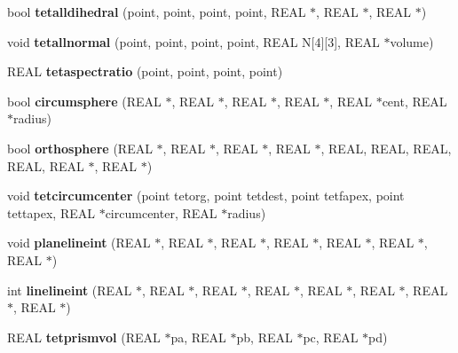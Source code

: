\begin{DoxyCompactItemize}
bool {\bfseries tetalldihedral} (point, point, point, point, R\+E\+AL $\ast$, R\+E\+AL $\ast$, R\+E\+AL $\ast$)
\item 
\mbox{\label{classtetgenmesh_a1d88027411fb3b8f7c3752b1a0b3eb14}} 
void {\bfseries tetallnormal} (point, point, point, point, R\+E\+AL N\mbox{[}4\mbox{]}\mbox{[}3\mbox{]}, R\+E\+AL $\ast$volume)
\item 
\mbox{\label{classtetgenmesh_a891ca3fde48f9e3378e14d5537216853}} 
R\+E\+AL {\bfseries tetaspectratio} (point, point, point, point)
\item 
\mbox{\label{classtetgenmesh_aa7ba47e0a0433aa33adc5310c9cf1b84}} 
bool {\bfseries circumsphere} (R\+E\+AL $\ast$, R\+E\+AL $\ast$, R\+E\+AL $\ast$, R\+E\+AL $\ast$, R\+E\+AL $\ast$cent, R\+E\+AL $\ast$radius)
\item 
\mbox{\label{classtetgenmesh_ab7a2c051ce249ec2921fffd2c6c0f24b}} 
bool {\bfseries orthosphere} (R\+E\+AL $\ast$, R\+E\+AL $\ast$, R\+E\+AL $\ast$, R\+E\+AL $\ast$, R\+E\+AL, R\+E\+AL, R\+E\+AL, R\+E\+AL, R\+E\+AL $\ast$, R\+E\+AL $\ast$)
\item 
\mbox{\label{classtetgenmesh_a215ee31d43785644ae7049d318e2b773}} 
void {\bfseries tetcircumcenter} (point tetorg, point tetdest, point tetfapex, point tettapex, R\+E\+AL $\ast$circumcenter, R\+E\+AL $\ast$radius)
\item 
\mbox{\label{classtetgenmesh_a883cf2b9f86e671d486bc33b37b4efe6}} 
void {\bfseries planelineint} (R\+E\+AL $\ast$, R\+E\+AL $\ast$, R\+E\+AL $\ast$, R\+E\+AL $\ast$, R\+E\+AL $\ast$, R\+E\+AL $\ast$, R\+E\+AL $\ast$)
\item 
\mbox{\label{classtetgenmesh_add5ae26e506dad8a94508127140b6aa4}} 
int {\bfseries linelineint} (R\+E\+AL $\ast$, R\+E\+AL $\ast$, R\+E\+AL $\ast$, R\+E\+AL $\ast$, R\+E\+AL $\ast$, R\+E\+AL $\ast$, R\+E\+AL $\ast$, R\+E\+AL $\ast$)
\item 
\mbox{\label{classtetgenmesh_af435ddd2a8d966f9e71ee01ff88385b4}} 
R\+E\+AL {\bfseries tetprismvol} (R\+E\+AL $\ast$pa, R\+E\+AL $\ast$pb, R\+E\+AL $\ast$pc, R\+E\+AL $\ast$pd)

\end{DoxyCompactItemize}
